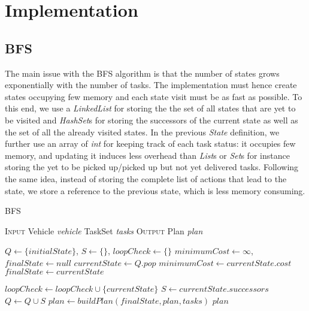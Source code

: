 \documentclass[10pt]{article}
\begin{document}
\section{Implementation}

\subsection{BFS}
The main issue with the BFS algorithm is that the number of states grows exponentially with the number of tasks.
The implementation must hence create states occupying few memory and each state visit must be as fast as possible.
To this end, we use a \textit{LinkedList} for storing the the set of all states that are yet to be visited and \textit{HashSet}s for storing the successors of the current state as well as the set of all the already visited states.
In the previous \textit{State} definition, we further use an array of \textit{int} for keeping track of each task status: it occupies few memory, and updating it induces less overhead than \textit{List}s or \textit{Set}s for instance storing the yet to be picked up/picked up but not yet delivered tasks.
Following the same idea, instead of storing the complete list of actions that lead to the state, we store a reference to the previous state, which is less memory consuming.

\begin{algorithm}[t]
\caption{BFS}
\begin{algorithmic}[1]
\Statex \textsc{Input}
\Statex \hspace{\algorithmicindent} Vehicle \textit{vehicle} 
\Statex \hspace{\algorithmicindent} TaskSet \textit{tasks} 
\Statex \textsc{Output}
\Statex \hspace{\algorithmicindent} Plan \textit{plan} 

\Statex	  
\State $Q \gets \{initialState\}$, $S \gets \{\}$, $loopCheck \gets \{\}$
\State $minimumCost \gets \infty$, $finalState \gets null$ 
	\State $currentState \gets Q.pop$
			\State $minimumCost \gets currentState.cost$
			\State $finalState \gets currentState$
		\EndIf
	\EndIf
	
		\State $loopCheck \gets loopCheck \cup \{currentState\}$
		\State $S \gets currentState.successors$
		\State $Q \gets Q \cup S$
	\EndIf
\EndWhile
\Statex $plan \gets buildPlan(finalState, plan, tasks)$
\State \Return $plan$
\end{algorithmic}
\end{algorithm}
\end{document}
